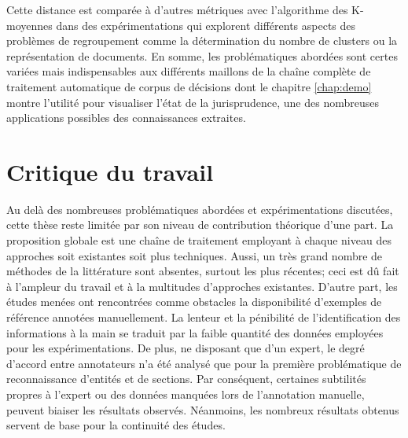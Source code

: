 Cette distance est comparée à d'autres métriques avec l'algorithme des K-moyennes dans des expérimentations qui explorent différents aspects des problèmes de regroupement comme la détermination du nombre de clusters ou la représentation de documents. En somme, les problématiques abordées sont certes variées mais indispensables aux différents maillons de la chaîne complète de traitement automatique de corpus de décisions dont le chapitre \ref{chap:demo} montre l'utilité pour visualiser l'état de la jurisprudence, une des nombreuses applications possibles des connaissances extraites. 


\section{Critique du travail}
\label{sec:conclusion:critique}
Au delà des nombreuses problématiques abordées et expérimentations discutées, cette thèse reste limitée par son niveau de contribution théorique d'une part. La proposition globale est une chaîne de traitement employant à chaque niveau des approches soit existantes soit plus techniques. Aussi, un très grand nombre de méthodes de la littérature sont absentes, surtout les plus récentes; ceci est dû fait à l'ampleur du travail et à la multitudes d'approches existantes.  D'autre part, les études menées ont rencontrées comme obstacles la disponibilité d'exemples de référence annotées manuellement. La lenteur et la pénibilité de l'identification des informations à la main se traduit par la faible quantité des données employées pour les expérimentations. De plus, ne disposant que d'un expert, le degré d'accord entre annotateurs n'a été analysé que pour la première problématique de reconnaissance d'entités et de sections. Par conséquent, certaines subtilités propres à l'expert ou des données manquées lors de l'annotation manuelle, peuvent biaiser les résultats observés. Néanmoins, les nombreux résultats obtenus servent de base pour la continuité des études. 


